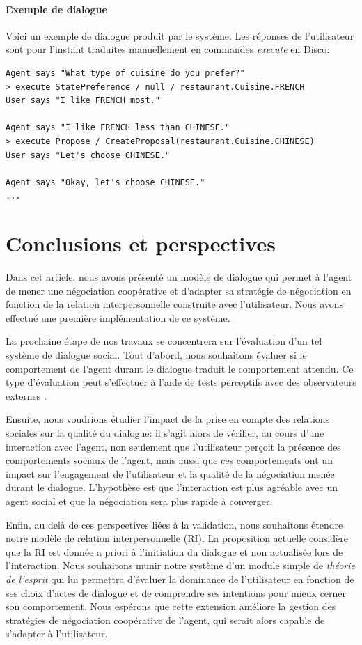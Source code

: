 \documentclass [french]{sig-alternate-05-2015}
\begin{document}
\paragraph{Exemple de dialogue}
Voici un exemple de dialogue produit par le système. Les réponses de l'utilisateur sont pour l'instant traduites manuellement en commandes \emph{execute} en Disco:
{\small
\begin{verbatim}
Agent says "What type of cuisine do you prefer?"
> execute StatePreference / null / restaurant.Cuisine.FRENCH
User says "I like FRENCH most."

Agent says "I like FRENCH less than CHINESE."
> execute Propose / CreateProposal(restaurant.Cuisine.CHINESE)
User says "Let's choose CHINESE."

Agent says "Okay, let's choose CHINESE."
...
\end{verbatim}
}

\section{Conclusions et perspectives}
\label{conc}
Dans cet article, nous avons présenté un modèle de dialogue qui permet à l'agent de mener une négociation coopérative et d'adapter sa stratégie de négociation en fonction de la relation interpersonnelle construite avec l'utilisateur. Nous avons effectué une première implémentation de ce système. 

\par La prochaine étape de nos travaux se concentrera sur l'évaluation d'un tel système de dialogue social. Tout d'abord, nous souhaitons évaluer si le comportement de l'agent durant le dialogue traduit le comportement attendu. Ce type d'évaluation peut s'effectuer à l'aide de tests perceptifs avec des observateurs externes \cite{bickmore2012empirical}.

\par Ensuite, nous voudrions étudier l'impact de la prise en compte des relations sociales sur la qualité du dialogue: il s'agit alors de vérifier, au cours d'une interaction avec l'agent, non seulement que l'utilisateur perçoit la présence des comportements sociaux de l'agent, mais aussi que ces comportements ont un impact sur l'engagement de l'utilisateur et la qualité de la négociation menée durant le dialogue. L'hypothèse est que l'interaction est plus agréable avec un agent social et que la négociation sera plus rapide à converger.

\par Enfin, au delà de ces perspectives liées à la validation, nous souhaitons étendre notre modèle de relation interpersonnelle (RI). La proposition actuelle considère que la RI est donnée a priori à l'initiation du dialogue et non actualisée lors de l'interaction. Nous souhaitons munir notre système d'un module simple de \emph{théorie de l'esprit} qui lui permettra d'évaluer la dominance de l'utilisateur en fonction de ses choix d'actes de dialogue et de comprendre ses intentions pour mieux cerner son comportement. Nous espérons que cette extension améliore la gestion des stratégies de négociation coopérative de l'agent, qui serait alors capable de s'adapter à l'utilisateur.
 
\vskip 5pt


\end{document}
